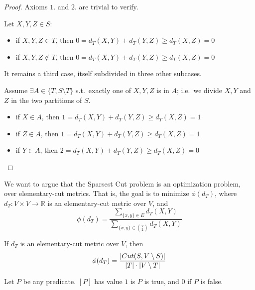     \begin{proof}
        Axioms $1.$ and $2.$ are trivial to verify.

        Let $X,Y,Z \in S$:
        \begin{itemize}
            \item if $X,Y,Z \in T$, then $0 = d_T(X,Y) + d_T(Y,Z) \geq d_T(X,Z) = 0$
            \item if $X,Y,Z \not\in T$, then $0 = d_T(X,Y) + d_T(Y,Z) \geq d_T(X,Z) = 0$
        \end{itemize}

        It remains a third case, itself subdivided in three other subcases.

        Assume $\exists A \in \{ T, S \setminus T \}$ s.t.~exactly one of $X,Y,Z$ is in $A$; i.e.~we divide $X,Y$ and $Z$ in the two partitions of $S$.
        \begin{itemize}
            \item if $X \in A$, then $1 = d_T(X,Y) + d_T(Y,Z) \geq d_T(X,Z) = 1$
            \item if $Z \in A$, then $1 = d_T(X,Y) + d_T(Y,Z) \geq d_T(X,Z) = 1$
            \item if $Y \in A$, then $2 = d_T(X,Y) + d_T(Y,Z) \geq d_T(X,Z) = 0$
        \end{itemize}
    \end{proof}

    We want to argue that the Sparsest Cut problem is an optimization problem, over elementary-cut metrics.
    That is, the goal is to minimize $\phi(d_T)$, where $d_T : V \times V \rightarrow \mathbb{R}$ is an elementary-cut metric over $V$, and
    \[ \phi(d_T) = \dfrac{\sum_{\{x,y\} \in E} d_T(X,Y)}{\sum_{\{x,y\} \in \binom{V}{2}} d_T(X,Y)} \]

    \begin{lemma}\label{lemma:metric2}
        If $d_T$ is an elementary-cut metric over $V$, then
        \[ \phi(d_T) = \dfrac{\vert Cut(S, V \setminus S) \vert}{\vert T \vert \cdot \vert V \setminus T \vert} \]
    \end{lemma}

    Let $P$ be any predicate. $[P]$ has value $1$ is $P$ is true, and $0$ if $P$ is false.

